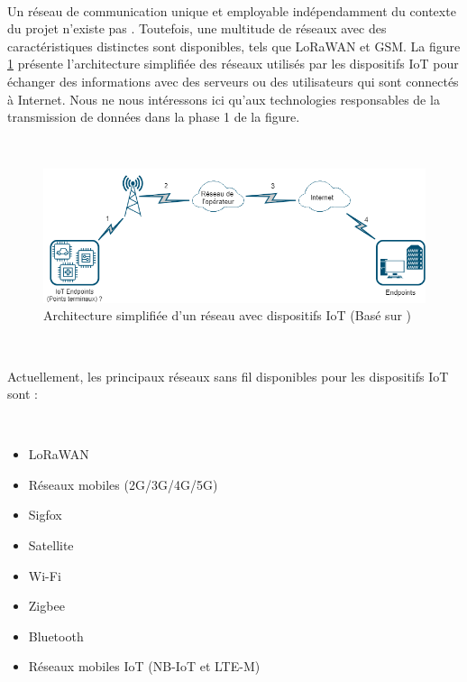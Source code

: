 ~

\noindent
Un réseau de communication unique et employable indépendamment du contexte du projet n'existe pas \cite{vannieuwenborg_iot}. Toutefois, une multitude de réseaux avec des caractéristiques distinctes sont disponibles, tels que LoRaWAN et GSM. La figure \ref{fig:network_archi} présente l'architecture simplifiée des réseaux utilisés par les dispositifs IoT pour échanger des informations avec des serveurs ou des utilisateurs qui sont connectés à Internet. Nous ne nous intéressons ici qu'aux technologies responsables de la transmission de données dans la phase 1 de la figure.

~

\begin{figure}[ht!]
  \includegraphics[width=\textwidth]{img/state_of_the_art/network_iot.png}
  \caption{Architecture simplifiée d'un réseau avec dispositifs IoT (Basé sur \cite{sanchez2016state, mekki2018overview})}
  \label{fig:network_archi}
\end{figure}

~

\noindent
Actuellement, les principaux réseaux sans fil disponibles pour les dispositifs IoT sont :

~

\begin{itemize}
  \item LoRaWAN
  \item Réseaux mobiles (2G/3G/4G/5G)
  \item Sigfox
  \item Satellite
  \item Wi-Fi
  \item Zigbee
  \item Bluetooth
  \item Réseaux mobiles IoT (NB-IoT et LTE-M)
\end{itemize}

~

